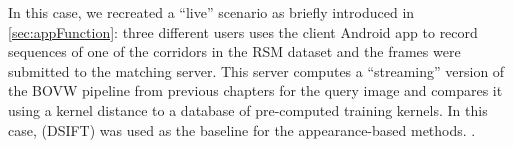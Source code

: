 In this case, we recreated a ``live'' scenario as briefly introduced in \ref{sec:appFunction}: three different users uses the client Android app to record sequences of one of the corridors in the RSM dataset and the frames were submitted to the matching server. This server computes a ``streaming'' version of the BOVW pipeline from previous chapters for the query image and compares it using a kernel distance to a database of pre-computed training kernels. In this case, (DSIFT) was used as the baseline for the appearance-based methods. .




%
%
%
%
%
